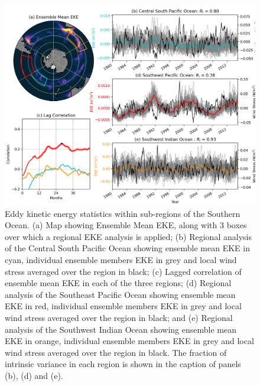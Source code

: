 \documentclass{agujournal2019}
\begin{document}
\begin{figure}[t]
\begin{center}
\includegraphics[width=\hsize]{Figure4}
\caption{Eddy kinetic energy statistics within sub-regions of the Southern Ocean. (a) Map showing Ensemble Mean EKE, along with 3 boxes over which a regional EKE analysis is applied; (b) Regional analysis of the Central South Pacific Ocean showing ensemble mean EKE in cyan, individual ensemble members EKE in grey and local wind stress averaged over the region in black; (c) Lagged correlation of ensemble mean EKE in each of the three regions; (d) Regional analysis of the Southeast Pacific Ocean showing ensemble mean EKE in red, individual ensemble members EKE in grey and local wind stress averaged over the region in black; and (e) Regional analysis of the Southwest Indian  Ocean showing ensemble mean EKE in orange, individual ensemble members EKE in grey and local wind stress averaged over the region in black. The fraction of intrinsic variance in each region is shown in the caption of panels (b), (d) and (e).}
\label{Fig:4}
\end{center}
\end{figure}
\end{document}
